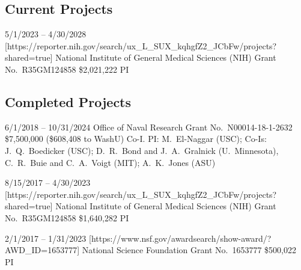 
\subsection*[Current Projects]{Current Projects}

  {5/1/2023 -- 4/30/2028}
  [https://reporter.nih.gov/search/ux\_L\_SUX\_kqhgfZ2\_JCbFw/projects?shared=true]
  {National Institute of General Medical Sciences (NIH) Grant No.\ R35GM124858}
  {\$2{,}021{,}222}
  {PI}



\subsection*[Completed Projects]{Completed Projects}

  {6/1/2018 -- 10/31/2024}
  {Office of Naval Research Grant No.\ N00014-18-1-2632}
  {\$7{,}500{,}000 (\$608{,}408 to WashU)}
  {Co-I. PI: M.\ El-Naggar (USC); Co-Is: J.\ Q.\ Boedicker (USC); D.\ R.\ Bond and J.\ A.\ Gralnick (U.\ Minnesota), C.\ R.\ Buie and C.\ A.\ Voigt (MIT); A.\ K.\ Jones (ASU)}

  {8/15/2017 -- 4/30/2023}
  [https://reporter.nih.gov/search/ux\_L\_SUX\_kqhgfZ2\_JCbFw/projects?shared=true]
  {National Institute of General Medical Sciences (NIH) Grant No.\ R35GM124858}
  {\$1{,}640{,}282}
  {PI}
  
  {2/1/2017 -- 1/31/2023}
  [https://www.nsf.gov/awardsearch/show-award/?AWD\_ID=1653777]
  {National Science Foundation Grant No.\ 1653777}
  {\$500{,}022}
  {PI}
  
